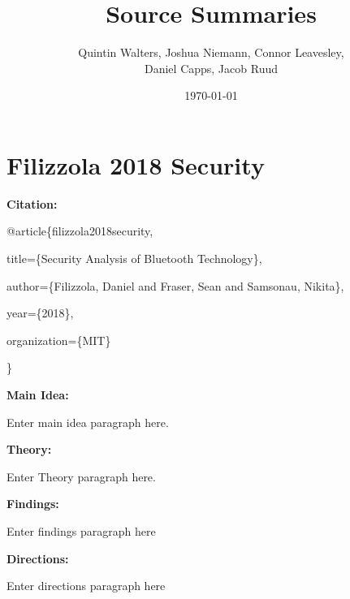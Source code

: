 \documentclass[a4paper,12pt]{article}
\begin{document}
    \title{Source Summaries}
    \author{Quintin Walters, Joshua Niemann, Connor Leavesley,\\
    Daniel Capps, Jacob Ruud}
    \date{\today}
    \maketitle
\break
\tableofcontents
\break

\section{Filizzola 2018 Security}
\noindent
\textbf{Citation:}

\noindent
@article\{filizzola2018security,

title=\{Security Analysis of Bluetooth Technology\},

author=\{Filizzola, Daniel and Fraser, Sean and Samsonau, Nikita\},

year=\{2018\},

organization=\{MIT\}

\noindent
\}

\vspace{5mm}
\noindent
\textbf{Main Idea:}

\noindent
Enter main idea paragraph here.

\vspace{5mm}
\noindent
\textbf{Theory:}

\noindent
Enter Theory paragraph here.

\vspace{5mm}   
\noindent
\textbf{Findings:}

\noindent
Enter findings paragraph here

\vspace{5mm}  
\noindent
\textbf{Directions:}

\noindent
Enter directions paragraph here
\end{document}
